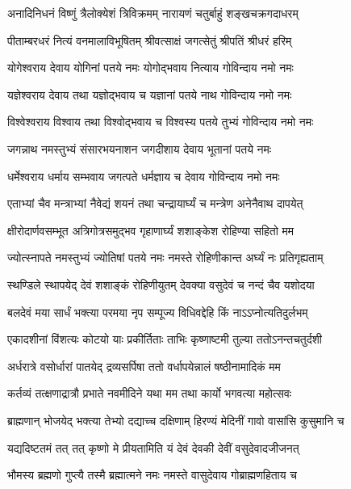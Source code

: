\twolineshloka
{अनादिनिधनं विष्णुं त्रैलोक्येशं त्रिविक्रमम्}
{नारायणं चतुर्बाहुं शङ्खचक्रगदाधरम्}%


\twolineshloka
{पीताम्बरधरं नित्यं वनमालाविभूषितम्}
{श्रीवत्साक्षं जगत्सेतुं श्रीपतिं श्रीधरं हरिम्}%


\twolineshloka
{योगेश्वराय देवाय योगिनां पतये नमः}
{योगोद्भवाय नित्याय गोविन्दाय नमो नमः}%


\twolineshloka
{यज्ञेश्वराय देवाय तथा यज्ञोद्भवाय च}
{यज्ञानां पतये नाथ गोविन्दाय नमो नमः}%


\twolineshloka
{विश्वेश्वराय विश्वाय तथा विश्वोद्भवाय च}
{विश्वस्य पतये तुभ्यं गोविन्दाय नमो नमः}%


\twolineshloka
{जगन्नाथ नमस्तुभ्यं संसारभयनाशन}
{जगदीशाय देवाय भूतानां पतये नमः}%


\twolineshloka
{धर्मेश्वराय धर्माय सम्भवाय जगत्पते}
{धर्मज्ञाय च देवाय गोविन्दाय नमो नमः}%


\twolineshloka
{एताभ्यां चैव मन्त्राभ्यां नैवेद्यं शयनं तथा}
{चन्द्रायार्घ्यं च मन्त्रेण अनेनैवाथ दापयेत्}%


\twolineshloka
{क्षीरोदार्णवसम्भूत अत्रिगोत्रसमुद्भव}
{गृहाणार्घ्यं शशाङ्केश रोहिण्या सहितो मम}%


\twolineshloka
{ज्योत्स्नापते नमस्तुभ्यं ज्योतिषां पतये नमः}
{नमस्ते रोहिणीकान्त अर्घ्यं नः प्रतिगृह्यताम्}%


\twolineshloka
{स्थण्डिले स्थापयेद् देवं शशाङ्कं रोहिणीयुतम्}
{देवक्या वसुदेवं च नन्दं चैव यशोदया}%


\twolineshloka
{बलदेवं मया सार्धं भक्त्या परमया नृप}
{सम्पूज्य विधिवद्देहि किं नाऽऽप्नोत्यतिदुर्लभम्}%


\twolineshloka
{एकादशीनां विंशत्यः कोटयो याः प्रकीर्तिताः}
{ताभिः कृष्णाष्टमी तुल्या ततोऽनन्तचतुर्दशी}%


\twolineshloka
{अर्धरात्रे वसोर्धारां पातयेद् द्रव्यसर्पिषा}
{ततो वर्धापयेन्नालं षष्ठीनामादिकं मम}%


\twolineshloka
{कर्तव्यं तत्क्षणाद्रात्रौ प्रभाते नवमीदिने}
{यथा मम तथा कार्यो भगवत्या महोत्सवः}%


\twolineshloka
{ब्राह्मणान् भोजयेद् भक्त्या तेभ्यो दद्याच्च दक्षिणाम्}
{हिरण्यं मेदिनीं गावो वासांसि कुसुमानि च}%


\twolineshloka
{यद्यदिष्टतमं तत् तत् कृष्णो मे प्रीयतामिति}
{यं देवं देवकी देवीं वसुदेवादजीजनत्}%


\twolineshloka
{भौमस्य ब्रह्मणो गुप्त्यै तस्मै ब्रह्मात्मने नमः}
{नमस्ते वासुदेवाय गोब्राह्मणहिताय च}%


